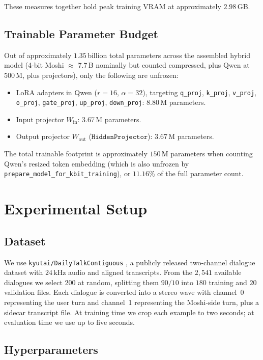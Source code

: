 \documentclass[conference]{IEEEtran}
\begin{document}
These measures together hold peak training VRAM at approximately $2.98$\,GB.

\subsection{Trainable Parameter Budget}

Out of approximately $1.35$\,billion total parameters across the assembled hybrid model (4-bit Moshi $\approx$ 7.7\,B nominally but counted compressed, plus Qwen at 500\,M, plus projectors), only the following are unfrozen:

\begin{itemize}
    \item LoRA adapters in Qwen ($r=16$, $\alpha=32$), targeting \texttt{q\_proj}, \texttt{k\_proj}, \texttt{v\_proj}, \texttt{o\_proj}, \texttt{gate\_proj}, \texttt{up\_proj}, \texttt{down\_proj}: 8.80\,M parameters.
    \item Input projector $W_{\text{in}}$: 3.67\,M parameters.
    \item Output projector $W_{\text{out}}$ ($\texttt{HiddenProjector}$): 3.67\,M parameters.
\end{itemize}
The total trainable footprint is approximately $150$\,M parameters when counting Qwen's resized token embedding (which is also unfrozen by \texttt{prepare\_model\_for\_kbit\_training}), or $11.16\%$ of the full parameter count.

\section{Experimental Setup}
\label{sec:setup}

\subsection{Dataset}

We use \texttt{kyutai/DailyTalkContiguous} \cite{dailytalk2023}, a publicly released two-channel dialogue dataset with $24$\,kHz audio and aligned transcripts. From the $2{,}541$ available dialogues we select $200$ at random, splitting them $90/10$ into $180$ training and $20$ validation files. Each dialogue is converted into a stereo wave with channel~0 representing the user turn and channel~1 representing the Moshi-side turn, plus a sidecar transcript file. At training time we crop each example to two seconds; at evaluation time we use up to five seconds.

\subsection{Hyperparameters}
\end{document}
